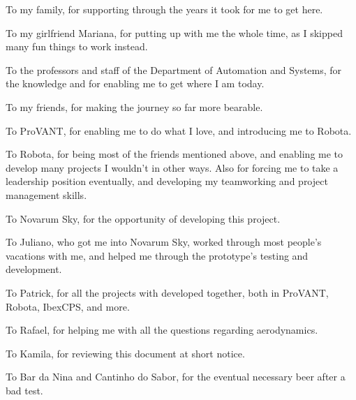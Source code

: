 \begin{agradecimentos}

To my family, for supporting through the years it took for me to get here.

To my girlfriend Mariana, for putting up with me the whole time, as I skipped many fun things to work instead.

To the professors and staff of the Department of Automation and Systems, for the knowledge and for enabling me to get where I am today.

To my friends, for making the journey so far more bearable.

To ProVANT, for enabling me to do what I love, and introducing me to Robota. 

To Robota, for being most of the friends mentioned above, and enabling me to develop many projects I wouldn't in other ways. Also for forcing me to take a leadership position eventually, and developing my teamworking and project management skills.

To Novarum Sky, for the opportunity of developing this project.

To Juliano, who got me into Novarum Sky, worked through most people's vacations with me, and helped me through the prototype's testing and development.

To Patrick, for all the projects with developed together, both in ProVANT, Robota, IbexCPS, and more.

To Rafael, for helping me with all the questions regarding aerodynamics.

To Kamila, for reviewing this document at short notice.

To Bar da Nina and Cantinho do Sabor, for the eventual necessary beer after a bad test.



\end{agradecimentos}
